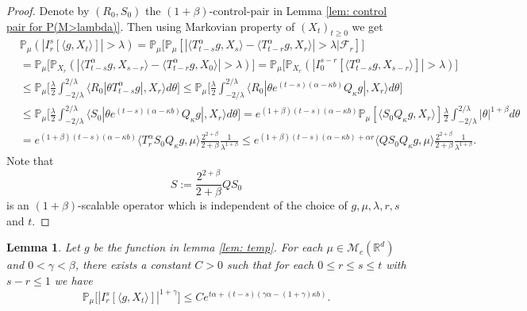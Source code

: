 \documentclass[12pt,oneside,english]{amsart}
\theoremstyle{plain}
\newtheorem{lem}[thm]{Lemma}
\theoremstyle{definition}
\numberwithin{equation}{section}
\newcommand{\added}[1]{{\color{blue}#1}}\newcommand{\deleted}[1]{{\color{red}#1}}
\begin{document}
\begin{proof}
    Denote by $(R_0,S_0)$ the $(1+\beta)$-control-pair in Lemma \ref{lem: control pair for P(M>lambda)}.
    Then using Markovian property of $(X_t)_{t\geq 0}$ we get
\begin{align}
    &\mathbb P_{\mu}(|I_r^s[\langle g, X_t\rangle]|>\lambda)
    = \mathbb P_\mu \big[\mathbb P_\mu[|\langle T_{t-s}^\alpha g, X_{s}\rangle - \langle T_{t-r}^\alpha g, X_{r}\rangle|> \lambda\big| \mathscr F_r]\big]
    \\&= \mathbb P_\mu \big[\mathbb P_{X_r}(|\langle T_{t-s}^\alpha g, X_{s-r}\rangle - \langle T_{t-r}^\alpha g, X_{0}\rangle|> \lambda)\big]
    = \mathbb P_\mu \big[\mathbb P_{X_r}(|I_0^{s-r}[\langle T_{t-s}^\alpha g, X_{s-r}\rangle] |> \lambda)\big]
    \\&\leq \mathbb P_\mu \Big[ \frac{\lambda}{2}\int_{-2/\lambda}^{2/\lambda}\langle R_0|\theta T^\alpha_{t-s}g|,X_r\rangle d\theta \Big]
    \leq \mathbb P_\mu \Big[ \frac{\lambda}{2}\int_{-2/\lambda}^{2/\lambda}\langle R_0|\theta e^{(t-s)(\alpha- \kappa b)}Q_{\kappa}g|,X_r\rangle d\theta \Big]
	\\&\leq \mathbb P_\mu \Big[ \frac{\lambda}{2}\int_{-2/\lambda}^{2/\lambda}\langle S_0|\theta e^{(t-s)(\alpha- \kappa b)}Q_{\kappa}g|,X_r\rangle d\theta \Big]
    = e^{(1+\beta)(t-s)(\alpha- \kappa b)} \mathbb P_\mu [ \langle S_0Q_{\kappa}g,X_r\rangle ] \frac{\lambda}{2}\int_{-2/\lambda}^{2/\lambda}|\theta|^{1+\beta}d\theta
    \\& = e^{(1+\beta)(t-s)(\alpha- \kappa b)} \langle T_r^\alpha S_0Q_{\kappa}g,\mu\rangle  \frac{2^{2+\beta}}{2+\beta}\frac{1}{\lambda^{1+\beta}}
    \leq e^{(1+\beta)(t-s)(\alpha- \kappa b)+ \alpha r} \langle QS_0Q_{\kappa}g,\mu\rangle  \frac{2^{2+\beta}}{2+\beta}\frac{1}{\lambda^{1+\beta}}.
\end{align}
    Note that
\[
    S := \frac{2^{2+\beta}}{2+\beta}QS_0
\]
    is an $(1+\beta)$-scalable operator which is independent of the choice of $g,\mu, \lambda, r, s$ and $t$.
\end{proof}

\begin{lem}\label{lem: control of mgtrs}
    \added{Let $g$ be the function in lemma \ref{lem: temp}.}
    For each $\mu \in \mathcal M_c(\mathbb{R}^d)$ and $0<\gamma < \beta$, there exists a constant $C>0$ such that for each $0\leq r\leq s\leq t$ with $s-r \leq 1$ we have
\[
    \mathbb P_\mu\big[|I_r^s[\langle g, X_t\rangle]|^{1+\gamma}\big]
    \leq C e^{t\alpha+(t-s) (\gamma\alpha- (1+\gamma)\kappa b)}.
\]
\end{lem}
\end{document}
